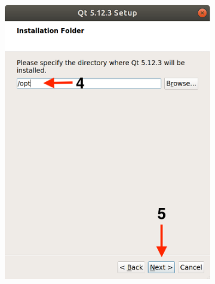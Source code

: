 \begin{figure}[H]
\begin{subfigure}{0.32\linewidth}
        \includegraphics[width=1\textwidth]{Images/Qt4.png}
    \end{subfigure}
    \begin{subfigure}{0.32\linewidth}

\end{subfigure}
\end{figure}

